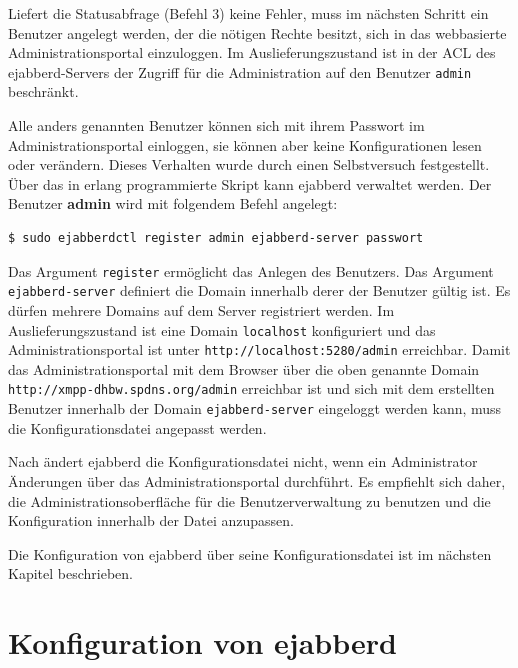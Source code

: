 \documentclass[a4paper,titlepage,halfparskip,12pt]{scrreprt}
\begin{document}
\begin{onehalfspacing}
Liefert die Statusabfrage (Befehl 3) keine Fehler, muss im nächsten Schritt ein Benutzer angelegt werden, der die nötigen Rechte besitzt, sich in das webbasierte Administrationsportal einzuloggen. Im Auslieferungszustand ist in der \ac{ACL} des ejabberd-Servers der Zugriff für die Administration auf den Benutzer \texttt{admin} beschränkt.\cite{ejabberdMGMT}

Alle anders genannten Benutzer können sich mit ihrem Passwort im Administrationsportal einloggen, sie können aber keine Konfigurationen lesen oder verändern. Dieses Verhalten wurde durch einen Selbstversuch festgestellt. Über das in erlang programmierte Skript kann ejabberd verwaltet werden. Der Benutzer \textbf{admin} wird mit folgendem Befehl angelegt:\cite{ejabberdMGMT}

\bigskip

\begin{lstlisting}[language=bash, caption={Anlegen eines Benutzers für die Verwaltung von ejabberd},label={lst:AddAdminUserEjabberd}]
$ sudo ejabberdctl register admin ejabberd-server passwort
\end{lstlisting}

Das Argument \texttt{register} ermöglicht das Anlegen des Benutzers. Das Argument \texttt{ejabberd-server} definiert die Domain innerhalb derer der Benutzer gültig ist. Es dürfen mehrere Domains auf dem Server registriert werden. Im Auslieferungszustand ist eine Domain \texttt{localhost} konfiguriert und das Administrationsportal ist unter \texttt{http://localhost:5280/admin} erreichbar. Damit das Administrationsportal mit dem Browser über die oben genannte Domain \texttt{http://xmpp-dhbw.spdns.org/admin} erreichbar ist und sich mit dem erstellten Benutzer innerhalb der Domain \texttt{ejabberd-server} eingeloggt werden kann, muss die Konfigurationsdatei angepasst werden.\cite{ejabberdMGMT}

Nach \cite{ejabberdDoc} ändert ejabberd die Konfigurationsdatei nicht, wenn ein Administrator Änderungen über das Administrationsportal durchführt. Es empfiehlt sich daher, die Administrationsoberfläche für die Benutzerverwaltung zu benutzen und die Konfiguration innerhalb der Datei anzupassen.

Die Konfiguration von ejabberd über seine Konfigurationsdatei ist im nächsten Kapitel beschrieben.


\section{Konfiguration von ejabberd}
\label{sec:Konfiguration}


\end{onehalfspacing}
\end{document}
